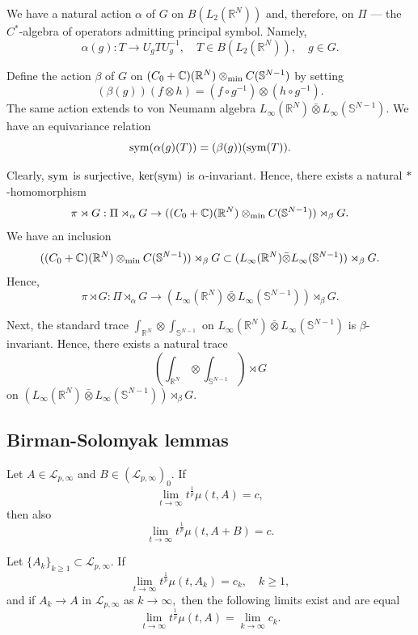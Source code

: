 \documentclass{amsart}
\begin{document}
We have a natural action $\alpha$ of $G$ on $B(L_2(\mathbb{R}^N))$ and, therefore, on $\Pi$ --- the $C^{\ast}$-algebra of operators admitting principal symbol. Namely,
$$\alpha(g):T\to U_gTU_g^{-1},\quad T\in B(L_2(\mathbb{R}^N)),\quad g\in G.$$

Define the action $\beta$ of $G$ on $(C_0+\mathbb{C})(\mathbb{R}^N)\otimes_{{\rm min}}C(\mathbb{S}^{N-1})$ by setting
$$(\beta(g))(f\otimes h)=(f\circ g^{-1})\otimes (h\circ g^{-1}).$$
The same action extends to von Neumann algebra $L_{\infty}(\mathbb{R}^N)\bar{\otimes}L_{\infty}(\mathbb{S}^{N-1}).$
We have an equivariance relation
$${\rm sym}(\alpha(g)(T))=(\beta(g))({\rm sym}(T)).$$

Clearly, ${\rm sym}$ is surjective, ${\rm ker}({\rm sym})$ is $\alpha$-invariant. Hence, there exists a natural $\ast$-homomorphism $$\pi\rtimes G:\Pi\rtimes_{\alpha}G\to ((C_0+\mathbb{C})(\mathbb{R}^N)\otimes_{{\rm min}}C(\mathbb{S}^{N-1}))\rtimes_{\beta}G.$$
We have an inclusion
$$((C_0+\mathbb{C})(\mathbb{R}^N)\otimes_{{\rm min}}C(\mathbb{S}^{N-1}))\rtimes_{\beta}G\subset (L_{\infty}(\mathbb{R}^N)\bar{\otimes}L_{\infty}(\mathbb{S}^{N-1}))\rtimes_{\beta}G.$$
Hence,
$$\pi\rtimes G:\Pi\rtimes_{\alpha}G\to (L_{\infty}(\mathbb{R}^N)\bar{\otimes}L_{\infty}(\mathbb{S}^{N-1}))\rtimes_{\beta}G.$$


Next, the standard trace $\int_{\mathbb{R}^N}\otimes\int_{\mathbb{S}^{N-1}}$ on $L_{\infty}(\mathbb{R}^N)\bar{\otimes}L_{\infty}(\mathbb{S}^{N-1})$ is $\beta$-invariant. Hence, there exists a natural trace
$$(\int_{\mathbb{R}^N}\otimes\int_{\mathbb{S}^{N-1}})\rtimes G$$
on $(L_{\infty}(\mathbb{R}^N)\bar{\otimes}L_{\infty}(\mathbb{S}^{N-1}))\rtimes_{\beta}G.$

\subsection{Birman-Solomyak lemmas}

\begin{lemma}\label{bs separable lemma} Let $A\in\mathcal{L}_{p,\infty}$ and $B\in(\mathcal{L}_{p,\infty})_0.$ If
$$\lim_{t\to\infty}t^{\frac1p}\mu(t,A)=c,$$
then also
$$\lim_{t\to\infty}t^{\frac1p}\mu(t,A+B)=c.$$
\end{lemma}

\begin{lemma}\label{bs limit lemma} Let $\{A_k\}_{k\geq1}\subset\mathcal{L}_{p,\infty}.$ If
$$\lim_{t\to\infty}t^{\frac1p}\mu(t,A_k)=c_k,\quad k\geq1,$$
and if $A_k\to A$ in $\mathcal{L}_{p,\infty}$ as $k\to\infty,$ then the following limits exist and are equal
$$\lim_{t\to\infty}t^{\frac1p}\mu(t,A)=\lim_{k\to\infty}c_k.$$
\end{lemma}
\end{document}
